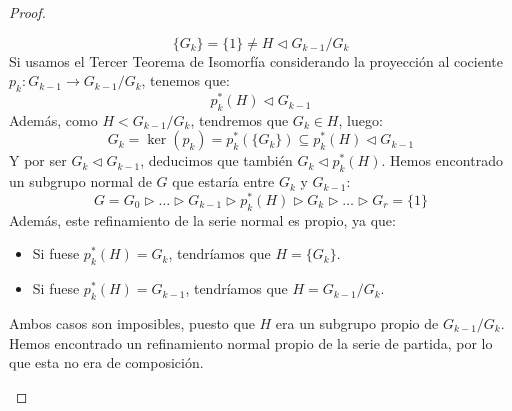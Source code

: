 \begin{prop}
\begin{proof}
\begin{description}
\begin{equation*}
                    \{G_k\} = \{1\} \neq H \lhd G_{k-1}/G_k
                \end{equation*}
                Si usamos el Tercer Teorema de Isomorfía considerando la proyección al cociente $p_k:G_{k-1}\to G_{k-1}/G_k$, tenemos que:
                \begin{equation*}
                    p^\ast_k(H) \lhd G_{k-1}
                \end{equation*}
                Además, como $H < G_{k-1}/G_k$, tendremos que $G_k \in H$, luego:
                \begin{equation*}
                    G_k = \ker(p_k) = p_k^\ast(\{G_k\}) \subseteq p_k^\ast(H) \lhd G_{k-1}
                \end{equation*}
                Y por ser $G_k \lhd G_{k-1}$, deducimos que también $G_k\lhd p_k^\ast(H)$. Hemos encontrado un subgrupo normal de $G$ que estaría entre $G_k$ y $G_{k-1}$:
                \begin{equation*}
                    G = G_0 \rhd \ldots \rhd G_{k-1} \rhd p_k^\ast(H) \rhd G_k \rhd \ldots \rhd G_r = \{1\}
                \end{equation*}
                Además, este refinamiento de la serie normal es propio, ya que:
                \begin{itemize}
                    \item Si fuese $p_k^\ast(H) = G_k$, tendríamos que $H = \{G_k\}$.
                    \item Si fuese $p_k^\ast(H) = G_{k-1}$, tendríamos que $H = G_{k-1}/G_k$.
                \end{itemize}
                Ambos casos son imposibles, puesto que $H$ era un subgrupo propio de $G_{k-1}/G_k$. Hemos encontrado un refinamiento normal propio de la serie de partida, por lo que esta no era de composición.
        \end{description}
    \end{proof}
\end{prop}

